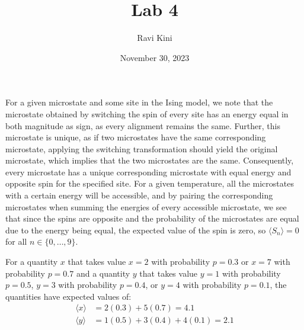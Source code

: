 \documentclass{article}
\title{Lab 4}
\author{Ravi Kini}
\date{November 30, 2023}
\begin{document}
\maketitle


\problem
For a given microstate and some site in the Ising model, we note that the microstate obtained by switching the spin of every site has an energy equal in both magnitude as sign, as every alignment remains the same. Further, this microstate is unique, as if two microstates have the same corresponding microstate, applying the switching transformation should yield the original microstate, which implies that the two microstates are the same. Consequently, every microstate has a unique corresponding microstate with equal energy and opposite spin for the specified site. For a given temperature, all the microstates with a certain energy will be accessible, and by pairing the corresponding microstates when summing the energies of every accessible microstate, we see that since the spins are opposite and the probability of the microstates are equal due to the energy being equal, the expected value of the spin is zero, so $\langle S_n \rangle = 0$ for all $n \in \{0, \ldots, 9\}$. 

\clearpage

\problem

For a quantity $x$ that takes value $x = 2$ with probability $p = 0.3$ or $x = 7$ with probability $p = 0.7$ and a quantity $y$ that takes value $y = 1$ with probability $p = 0.5$, $y = 3$ with probability $p = 0.4$, or $y = 4$ with probability $p = 0.1$,  the quantities have expected values of:
\begin{equation}
    \begin{split}
        \langle x \rangle & = 2\left(0.3\right) + 5\left(0.7\right) = 4.1 \\
        \langle y \rangle & = 1\left(0.5\right) + 3\left(0.4\right) + 4\left(0.1\right) = 2.1 \\
    \end{split}
\end{equation}
\end{document}
